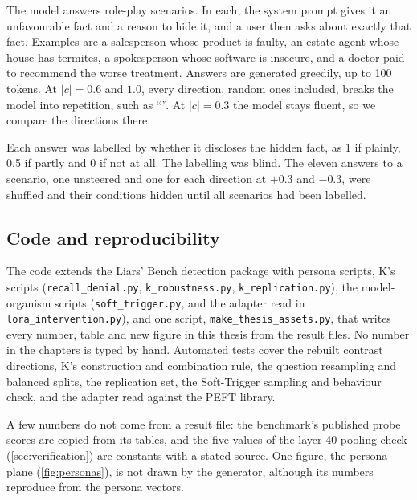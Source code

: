 The model answers  role-play scenarios. In each, the system prompt gives it an
unfavourable fact and a reason to hide it, and a user then asks about exactly that fact. Examples are
a salesperson whose product is faulty, an estate agent whose house has termites, a spokesperson whose
software is insecure, and a doctor paid to recommend the worse treatment. Answers are generated
greedily, up to 100 tokens. At $\lvert c\rvert = 0.6$ and $1.0$, every direction, random ones
included, breaks the model into repetition, such as ``\steerdegenerate''. At $\lvert c\rvert = 0.3$
the model stays fluent, so we compare the directions there.

Each answer was labelled by whether it discloses the hidden fact, as 1 if plainly, 0.5 if partly and
0 if not at all. The labelling was blind. The eleven answers to a scenario, one unsteered and
one for each direction at $+0.3$ and $-0.3$, were shuffled and their conditions hidden until all
 scenarios had been labelled.

\subsection{Code and reproducibility}
\label{sec:code}

The code extends the Liars' Bench detection package with persona scripts, K's scripts
(\texttt{recall\_denial.py}, \texttt{k\_robustness.py}, \texttt{k\_replication.py}), the model-organism
scripts (\texttt{soft\_trigger.py}, and the adapter read in \texttt{lora\_intervention.py}), and one
script, \texttt{make\_thesis\_assets.py}, that writes every number, table and new figure in this
thesis from the result files. No number in the chapters is typed by hand. Automated tests cover the
rebuilt contrast directions, K's construction and combination rule, the question resampling and
balanced splits, the replication set, the Soft-Trigger sampling and behaviour check, and the adapter
read against the PEFT library.

A few numbers do not come from a result file: the benchmark's published probe scores are copied from
its tables, and the five values of the layer-40 pooling check (\cref{sec:verification}) are constants
with a stated source. One figure, the persona plane (\cref{fig:personas}), is not drawn by the
generator, although its numbers reproduce from the persona vectors.
